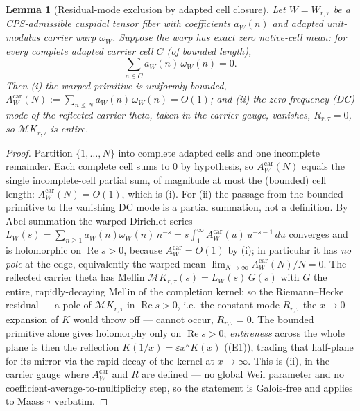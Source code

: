 \documentclass[11pt]{article}
\newtheorem{lemma}[theorem]{Lemma}
\theoremstyle{definition}
\renewcommand{\Re}{\operatorname{Re}}
\begin{document}
\begin{lemma}[Residual-mode exclusion by adapted cell closure]\label{lem:residual}
Let $W=W_{r,\tau}$ be a CPS-admissible cuspidal tensor fiber with coefficients $a_W(n)$ and adapted
unit-modulus carrier warp $\omega_W$. Suppose the warp has \emph{exact zero native-cell mean}: for every
complete adapted carrier cell $C$ (of bounded length),
\[
  \sum_{n\in C} a_W(n)\,\omega_W(n)=0 .
\]
Then \textup{(i)} the warped primitive is uniformly bounded,
$A^{\mathrm{car}}_W(N):=\sum_{n\le N} a_W(n)\,\omega_W(n)=O(1)$; and \textup{(ii)} the zero-frequency (DC)
mode of the reflected carrier theta, taken in the carrier gauge, vanishes, $R_{r,\tau}=0$, so
$\mathcal M K_{r,\tau}$ is entire.
\end{lemma}

\begin{proof}
Partition $\{1,\dots,N\}$ into complete adapted cells and one incomplete remainder. Each complete cell sums
to $0$ by hypothesis, so $A^{\mathrm{car}}_W(N)$ equals the single incomplete-cell partial sum, of magnitude
at most the (bounded) cell length: $A^{\mathrm{car}}_W(N)=O(1)$, which is \textup{(i)}. For \textup{(ii)} the
passage from the bounded primitive to the vanishing DC mode is a partial summation, not a definition. By Abel
summation the warped Dirichlet series
$L_W(s)=\sum_{n\ge1}a_W(n)\omega_W(n)\,n^{-s}=s\!\int_1^\infty A^{\mathrm{car}}_W(u)\,u^{-s-1}\,du$ converges and is
holomorphic on $\Re s>0$, because $A^{\mathrm{car}}_W=O(1)$ by \textup{(i)}; in particular it has \emph{no pole}
at the edge, equivalently the warped mean $\lim_{N\to\infty}A^{\mathrm{car}}_W(N)/N=0$. The reflected carrier
theta has Mellin $\mathcal M K_{r,\tau}(s)=L_W(s)\,G(s)$ with $G$ the entire, rapidly-decaying Mellin of the
completion kernel; so the Riemann--Hecke residual --- a pole of $\mathcal M K_{r,\tau}$ in $\Re s>0$, i.e.\ the
constant mode $R_{r,\tau}$ the $x\to0$ expansion of $K$ would throw off --- cannot occur, $R_{r,\tau}=0$. The
bounded primitive alone gives holomorphy only on $\Re s>0$; \emph{entireness} across the whole plane is then the
reflection $K(1/x)=\varepsilon x^{\kappa}K(x)$ (\textup{(E1)}), trading that half-plane for its mirror via the
rapid decay of the kernel at $x\to\infty$. This is \textup{(ii)}, in the carrier gauge where $A^{\mathrm{car}}_W$
and $R$ are defined --- no global Weil parameter and no coefficient-average-to-multiplicity step, so the
statement is Galois-free and applies to Maass $\tau$ verbatim.
\end{proof}
\end{document}
